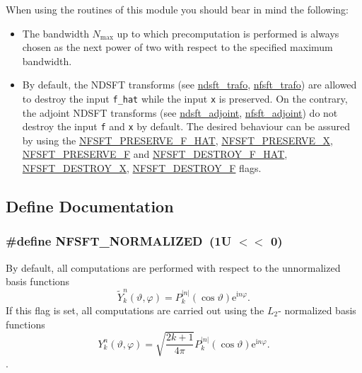 When using the routines of this module you should bear in mind the following: \begin{itemize}
\item The bandwidth $N_{\text{max}}$ up to which precomputation is performed is always chosen as the next power of two with respect to the specified maximum bandwidth. \item By default, the NDSFT transforms (see \hyperlink{group__nfsft_gc1bcdf551a0bf1b4a5890b87e583caf8}{ndsft\_\-trafo}, \hyperlink{group__nfsft_g5796fc68c432d46dfcab7abd8c56ee22}{nfsft\_\-trafo}) are allowed to destroy the input {\tt f\_\-hat} while the input {\tt x} is preserved. On the contrary, the adjoint NDSFT transforms (see \hyperlink{group__nfsft_g88c7be3ead1c726a1d5b8b903952c527}{ndsft\_\-adjoint}, \hyperlink{group__nfsft_g813bb48d404c7286310733c99a81a169}{nfsft\_\-adjoint}) do not destroy the input {\tt f} and {\tt x} by default. The desired behaviour can be assured by using the \hyperlink{group__nfsft_gc8a292845f0bdec6b0d8ef6eb693a00e}{NFSFT\_\-PRESERVE\_\-F\_\-HAT}, \hyperlink{group__nfsft_gcf7d73753b74dbf148167c3d46226f09}{NFSFT\_\-PRESERVE\_\-X}, \hyperlink{group__nfsft_g45962e763c2c551c1ea764a68b686b5c}{NFSFT\_\-PRESERVE\_\-F} and \hyperlink{group__nfsft_ga808899fc4db422c7b23470e6baad904}{NFSFT\_\-DESTROY\_\-F\_\-HAT}, \hyperlink{group__nfsft_g6f22df0b292db920d795b3e3569181f2}{NFSFT\_\-DESTROY\_\-X}, \hyperlink{group__nfsft_g2b32e2eabd33bf0886f6df45365d04c0}{NFSFT\_\-DESTROY\_\-F} flags. \end{itemize}


\subsection{Define Documentation}
\hypertarget{group__nfsft_g65036f479a7421863956c02aa78bc9be}{
\subsubsection{\setlength{\rightskip}{0pt plus 5cm}\#define NFSFT\_\-NORMALIZED~(1U $<$$<$ 0)}}
\label{group__nfsft_g65036f479a7421863956c02aa78bc9be}


By default, all computations are performed with respect to the unnormalized basis functions \[ \tilde{Y}_k^n(\vartheta,\varphi) = P_k^{|n|}(\cos\vartheta) \mathrm{e}^{\mathrm{i} n \varphi}. \] If this flag is set, all computations are carried out using the $L_2$- normalized basis functions \[ Y_k^n(\vartheta,\varphi) = \sqrt{\frac{2k+1}{4\pi}} P_k^{|n|}(\cos\vartheta) \mathrm{e}^{\mathrm{i} n \varphi}. \]. 

